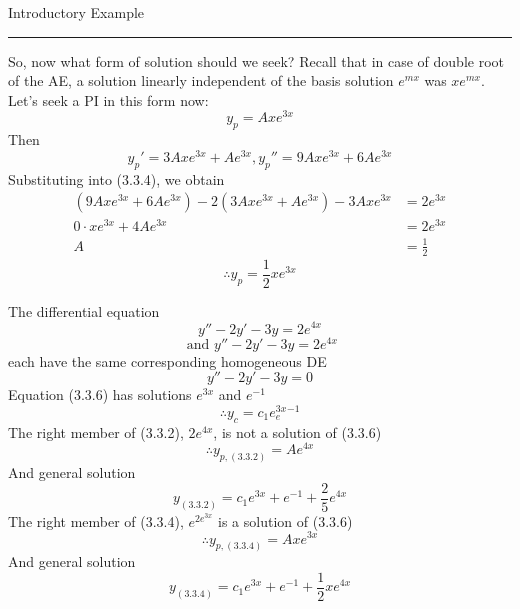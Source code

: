 \begin{example}{Introductory Example}{}
\rule{4in}{0.25pt}

So, now what form of solution should we seek? Recall that in case of double root of the AE, a solution linearly independent of the basis solution $e^{mx}$ was $xe^{mx}$. Let's seek a PI in this form now:
\begin{equation}
    y_p = Axe^{3x}
\end{equation}
Then \[
    y_p' = 3Axe^{3x} + Ae^{3x}, y_p'' = 9Axe^{3x} + 6Ae^{3x}
\]
Substituting into (3.3.4), we obtain
\begin{align*}
    (9Axe^{3x} + 6Ae^{3x}) - 2(3Axe^{3x} + Ae^{3x}) - 3Axe^{3x} &= 2e^{3x} \\
    0 \cdot xe^{3x} + 4Ae^{3x} &= 2e^{3x} \\
    A &= \frac{1}{2}
\end{align*}
\[ \therefore y_p = \frac{1}{2}xe^{3x} \]
\end{example}

The differential equation
\begin{equation}\tag{3.3.2}
    y'' - 2y' - 3y = 2e^{4x}
\end{equation}
\begin{equation}\tag{3.3.4}
    \text{ and } y'' - 2y' - 3y = 2e^{4x}
\end{equation}
each have the same corresponding homogeneous DE
\begin{equation}\tag{3.3.6}
    y'' - 2y' - 3y = 0
\end{equation}
Equation (3.3.6) has solutions $e^{3x}$ and $e^{-1}$ \[
    \therefore y_c = c_1e^{3x} _ e^{-1}
\]
The right member of (3.3.2), $2e^{4x}$, is not a solution of (3.3.6)
\begin{equation}
    \therefore y_{p,(3.3.2)} = Ae^{4x}
\end{equation}
And general solution \[
    y_{(3.3.2)} = c_1e^{3x} + e^{-1} + \frac{2}{5}e^{4x}
\]
The right member of (3.3.4), $e^{2e^{3x}}$ is a solution of (3.3.6)
\begin{equation}
    \therefore y_{p, (3.3.4)} = Axe^{3x}
\end{equation}
And general solution \[
    y_{(3.3.4)} = c_1e^{3x} + e^{-1} + \frac{1}{2}xe^{4x}
\]
























